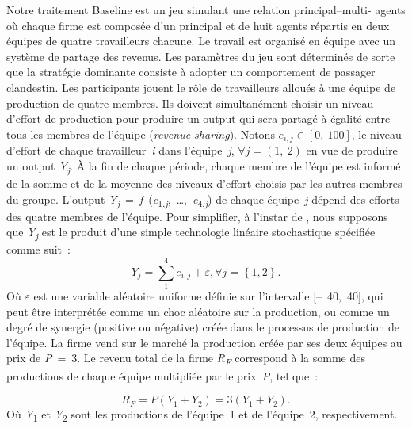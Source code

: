 \begin{Article}
\begin{refsection}[Lebourges]
Notre traitement Baseline est un jeu simulant une relation
principal--multi- agents où chaque firme est composée d'un principal et
de huit agents répartis en deux équipes de quatre travailleurs chacune.
Le travail est organisé en équipe avec un système de partage des
revenus. Les paramètres du jeu sont déterminés de sorte que la stratégie
dominante consiste à adopter un comportement de passager clandestin. Les
participants jouent le rôle de travailleurs alloués à une équipe de
production de quatre membres. Ils doivent simultanément choisir un
niveau d'effort de production pour produire un output qui sera partagé à
égalité entre tous les membres de l'équipe (\emph{revenue sharing}).
Notons
$e_{i,j} \in [0,~100]$, le
niveau d'effort de chaque travailleur~\emph{i} dans l'équipe~\emph{j},
$\forall j = (1,~2)$ en vue de produire un output
\emph{Y\textsubscript{j}}. À la fin de chaque période, chaque membre de
l'équipe est informé de la somme et de la moyenne des niveaux d'effort
choisis par les autres membres du groupe. L'output
\emph{Y\textsubscript{j}}~=~\emph{f}~(\emph{e}\textsubscript{1,\emph{j}},~\ldots,~\emph{e}\textsubscript{4,\emph{j}})
de chaque équipe~\emph{j} dépend des efforts des quatre membres de
l'équipe. Pour simplifier, à l'instar de \textcite{NalbantianSchotter1997}, nous supposons que \emph{Y\textsubscript{j}} est le produit
d'une simple technologie linéaire stochastique spécifiée comme suit~:
\begin{equation}
   Y_{j} = \sum_{1}^{4}e_{i,j} + \varepsilon, \forall j = \left\{ 1,2 \right\}.
\end{equation}
Où $\varepsilon$ est une variable aléatoire uniforme définie sur l'intervalle
[--~40,~40], qui peut être interprétée comme un choc aléatoire sur
la production, ou comme un degré de synergie (positive ou négative)
créée dans le processus de production de l'équipe. La firme vend sur le
marché la production créée par ses deux équipes au prix de \emph{P}~=~3.
Le revenu total de la firme \emph{R\textsubscript{F}} correspond à la
somme des productions de chaque équipe multipliée par le prix~\emph{P},
tel que~:

\newpage

\begin{equation}
R_{F} = P(Y_{1} + Y_{2}) = 3(Y_{1} + Y_{2}).
\end{equation}
Où \emph{Y}\textsubscript{1} et \emph{Y}\textsubscript{2} sont les
productions de l'équipe~1 et de l'équipe~2, respectivement.


\end{refsection}
\end{Article}
